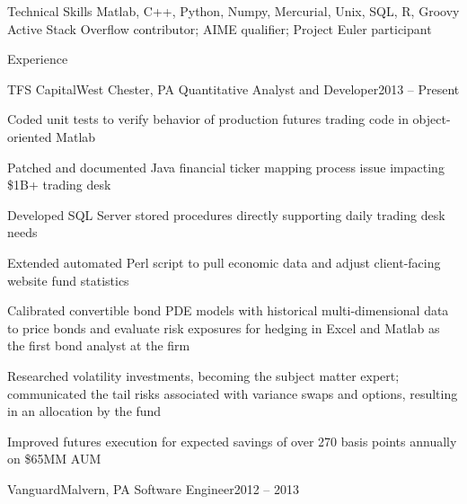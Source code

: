 \documentclass{resume}
\begin{document}

\begin{rSection}{Technical Skills}
Matlab, C++, Python, Numpy, Mercurial, Unix, SQL, R, Groovy \\
Active Stack Overflow contributor; AIME qualifier; Project Euler participant
\end{rSection}


\begin{rSection}{Experience}


\begin{rSubsection}{TFS Capital}{West Chester, PA}
{Quantitative Analyst and Developer}{2013 -- Present}

\item Coded unit tests to verify behavior of production futures
trading code in object-oriented Matlab
\item Patched and documented Java financial ticker mapping process
issue impacting \$1B+ trading desk
\item Developed SQL Server stored procedures directly supporting
daily trading desk needs
\item Extended automated Perl script to pull economic data and
adjust client-facing website fund statistics
\item Calibrated convertible bond PDE models with historical
multi-dimensional data to price bonds and evaluate risk exposures
for hedging in Excel and Matlab as the first bond analyst at the firm
\item Researched volatility investments, becoming the subject
matter expert; communicated the tail risks associated with variance
swaps and options, resulting in an allocation by the fund
\item Improved futures execution for expected savings of over
270 basis points annually on \$65MM AUM

\end{rSubsection}


\begin{rSubsection}{Vanguard}{Malvern, PA}
{Software Engineer}{2012 -- 2013}


\end{rSubsection}
\end{rSection}
\end{document}
